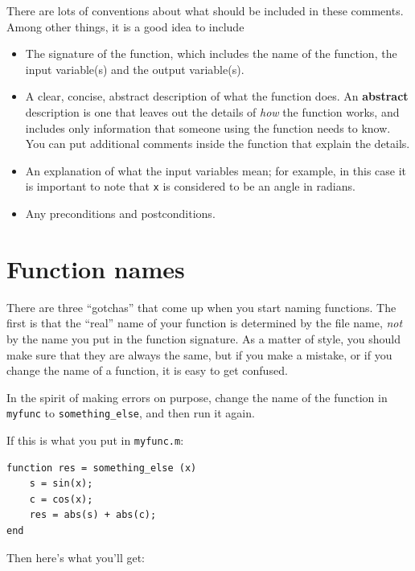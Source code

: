 \documentclass[
]{book}
\begin{document}
There are lots of conventions about what should be included
in these comments.  Among other things, it is a good idea to
include

\begin{itemize}

\item The signature of the function, which includes the name
of the function, the input variable(s) and the output variable(s).

\item A clear, concise, abstract description of what the function does.
An {\bf abstract} description is one that leaves out the
details of {\em how} the function works, and includes only information
that someone using the function needs to know.  You can put additional
comments inside the function that explain the details.

\item An explanation of what the input variables mean; for example,
in this case it is important to note that {\tt x} is considered
to be an angle in radians.

\item Any preconditions and postconditions.

\end{itemize}



\section{Function names}

There are three ``gotchas'' that come up when you start naming
functions.  The first is that the ``real'' name of your function
is determined by the file name, {\em not} by the name
you put in the function signature.  As a matter of style, you
should make sure that they are always the same, but if you
make a mistake, or if you change the name of a function, it is
easy to get confused.

In the spirit of making errors on purpose, change the name of
the function in {\tt myfunc} to {\tt something\_else}, and
then run it again.

If this is what you put in {\tt myfunc.m}:

\begin{verbatim}
function res = something_else (x)
    s = sin(x);
    c = cos(x);
    res = abs(s) + abs(c);
end
\end{verbatim}

Then here's what you'll get:
\end{document}
